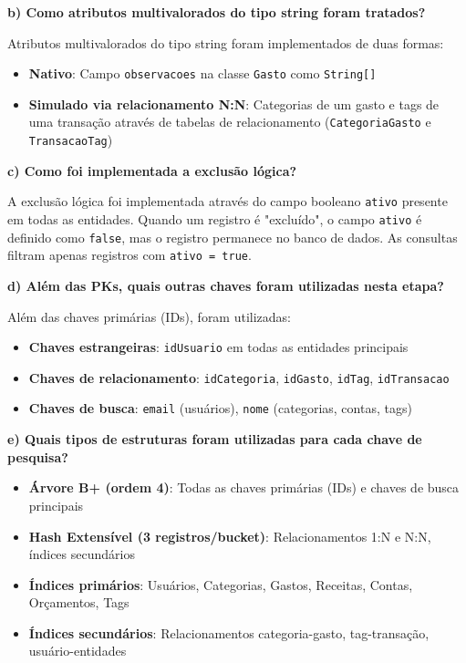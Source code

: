 \documentclass[12pt,a4paper]{article}
\begin{document}
\textbf{b) Como atributos multivalorados do tipo string foram tratados?}

Atributos multivalorados do tipo string foram implementados de duas formas:
\begin{itemize}
  \item \textbf{Nativo}: Campo \texttt{observacoes} na classe \texttt{Gasto} como \texttt{String[]}
  \item \textbf{Simulado via relacionamento N:N}: Categorias de um gasto e tags de uma transação através de tabelas de relacionamento (\texttt{CategoriaGasto} e \texttt{TransacaoTag})
\end{itemize}

\textbf{c) Como foi implementada a exclusão lógica?}

A exclusão lógica foi implementada através do campo booleano \texttt{ativo} presente em todas as entidades. Quando um registro é "excluído", o campo \texttt{ativo} é definido como \texttt{false}, mas o registro permanece no banco de dados. As consultas filtram apenas registros com \texttt{ativo = true}.

\textbf{d) Além das PKs, quais outras chaves foram utilizadas nesta etapa?}

Além das chaves primárias (IDs), foram utilizadas:
\begin{itemize}
  \item \textbf{Chaves estrangeiras}: \texttt{idUsuario} em todas as entidades principais
  \item \textbf{Chaves de relacionamento}: \texttt{idCategoria}, \texttt{idGasto}, \texttt{idTag}, \texttt{idTransacao}
  \item \textbf{Chaves de busca}: \texttt{email} (usuários), \texttt{nome} (categorias, contas, tags)
\end{itemize}

\textbf{e) Quais tipos de estruturas foram utilizadas para cada chave de pesquisa?}

\begin{itemize}
  \item \textbf{Árvore B+ (ordem 4)}: Todas as chaves primárias (IDs) e chaves de busca principais
  \item \textbf{Hash Extensível (3 registros/bucket)}: Relacionamentos 1:N e N:N, índices secundários
  \item \textbf{Índices primários}: Usuários, Categorias, Gastos, Receitas, Contas, Orçamentos, Tags
  \item \textbf{Índices secundários}: Relacionamentos categoria-gasto, tag-transação, usuário-entidades
\end{itemize}
\end{document}
